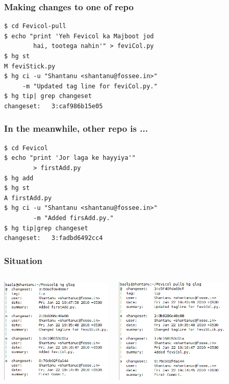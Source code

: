 \documentclass[14pt,compress]{beamer}
\begin{document}
\begin{frame}[fragile]
  \frametitle{Making changes to one of repo}
  \begin{lstlisting}
$ cd Fevicol-pull
$ echo "print 'Yeh Fevicol ka Majboot jod 
        hai, tootega nahin'" > feviCol.py
$ hg st
M feviStick.py
$ hg ci -u "Shantanu <shantanu@fossee.in>" 
     -m "Updated tag line for feviCol.py."
$ hg tip| grep changeset
changeset:   3:caf986b15e05
  \end{lstlisting} %
\end{frame}

\begin{frame}[fragile]
  \frametitle{In the meanwhile, other repo is ...}
  \begin{lstlisting}
$ cd Fevicol
$ echo "print 'Jor laga ke hayyiya'" 
        > firstAdd.py
$ hg add 
$ hg st
A firstAdd.py
$ hg ci -u "Shantanu <shantanu@fossee.in>"
        -m "Added firsAdd.py."
$ hg tip|grep changeset
changeset:   3:fadbd6492cc4    
  \end{lstlisting}
\end{frame}


\begin{frame}[fragile]
  \frametitle{Situation}
  \begin{columns}
    \begin{block}{}
      \includegraphics[height=2in, interpolate=true]{main}
    \end{block}
    \begin{block}{}
      \includegraphics[height=2in, interpolate=true]{clone}
    \end{block}
  \end{columns}
\end{frame}
\end{document}
